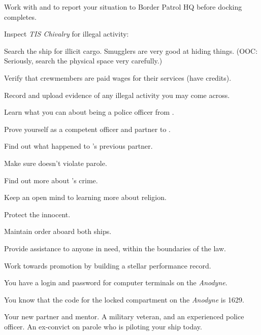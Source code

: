 \documentclass[char]{guildcamp4}
\begin{document}
\begin{itemz}[Goals]
	\item Work with \cCbad{} and \cPilot{} to report your situation to Border Patrol HQ before docking completes.
	\item Inspect \emph{TIS Chivalry} for illegal activity:
	\begin{itemz}
		\item Search the ship for illicit cargo. Smugglers are very good at hiding things. (OOC: Seriously, search the physical space very carefully.)
		\item Verify that crewmembers are paid wages for their services (have credits).
	\end{itemz}
	\item Record and upload evidence of any illegal activity you may come across.
	\item Learn what you can about being a police officer from \cCbad{}.
	\item Prove yourself as a competent officer and partner to \cCbad{}.
	\item Find out what happened to \cCbad{}'s previous partner.
	\item Make sure \cPilot{} doesn't violate \cPilot{\their} parole. 
	\item Find out more about \cPilot{}'s crime.
	\item Keep an open mind to learning more about religion.
	\item Protect the innocent.
	\item Maintain order aboard both ships.
	\item Provide assistance to anyone in need, within the boundaries of the law. 
	\item Work towards promotion by building a stellar performance record.
\end{itemz}

\begin{itemz}[Notes]
	\item You have a login and password for computer terminals on the \emph{Anodyne}.
	\item You know that the code for the locked compartment on the \emph{Anodyne} is 1629.
\end{itemz}

\begin{contacts}
	\contact{\cCbad{}} Your new partner and mentor. A military veteran, and an experienced police officer.
	\contact{\cPilot{}}	An ex-convict on parole who is piloting your ship today.
\end{contacts}
\end{document}
